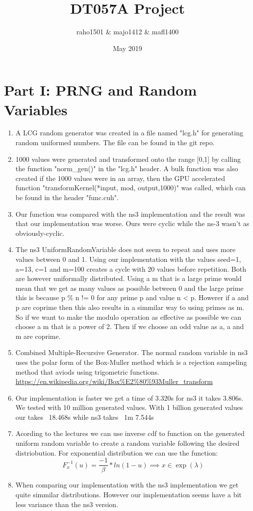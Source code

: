 \documentclass{article}
\title{DT057A Project}
\author{raho1501 \& majo1412 \& mafl1400}
\date{May 2019}
\begin{document}
\maketitle

\section{Part I: PRNG and Random Variables} \label{part1}
\begin{enumerate}
  \item A LCG random generator was created in a file named "lcg.h" for generating random uniformed numbers. The file can be found in the git repo.
  \item 1000 values were generated and transformed onto the range [0,1] by calling the function "norm\_gen()" in the "lcg.h" header. A bulk function was also created if the 1000 values were in an array, then the GPU accelerated function "transformKernel(*input, mod, output,1000)" was called, which can be found in the header "func.cuh".
  \item Our function was compared with the ns3 implementation and the result was that our implementation was worse. Ours were cyclic while the ns-3 wasn't as obviously-cyclic.
  \item The ns3 UniformRandomVariable does not seem to repeat and uses more values between 0 and 1. Using our implementation with the values seed=1, a=13, c=1 and m=100 creates a cycle with 20 values before repetition. Both are however uniformally distributed. Using a m that is a large prime would mean that we get as many values as possible between 0 and the large prime this is because p \% n != 0 for any prime p and value n < p. Howerer if a and p are coprime then this also results in a simmilar way to using primes as m. So if we want to make the modulo operation as effective as possible we can choose a m that is a power of 2. Then if we choose an odd value as a, a and m are coprime.
  \item Combined Multiple-Recursive Generator. The normal random variable in ns3 uses the polar form of the Box-Muller method which is a rejection sampeling method that aviods using trigometric functions. \url{https://en.wikipedia.org/wiki/Box\%E2\%80\%93Muller_transform}
  \item Our implementation is faster we get a time of 3.320s for ns3 it takes 3.806s. We tested with 10 million generated values. With 1 billion generated values our takes ~18.468s while ns3 takes ~1m 7.544s
  \item Acording to the lectures we can use inverse cdf to function on the generated uniform random variable to create a random variable following the desired distriobution. For exponential distribution we can use the function:$$ F^{-1}_x(u) = \frac{-1}{\beta} * ln(1-u) \implies x \in \exp{(\lambda)} $$
  \item When comparing our implementation with the ns3 implementation we get quite simmilar distributions. However our implementation seems have a bit less variance than the ns3 version.
\end{enumerate}
\end{document}
